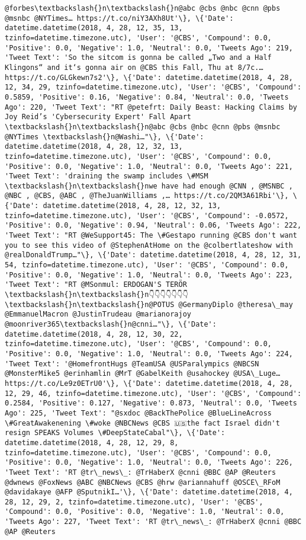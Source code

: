 \documentclass[11pt]{article}
\begin{document}
\begin{Verbatim}[commandchars=\\\{\}]
@forbes\textbackslash{}n\textbackslash{}n@abc @cbs @nbc @cnn @pbs @msnbc @NYTimes… https://t.co/niY3AXh8Ut'\}, \{'Date': datetime.datetime(2018, 4, 28, 12, 35, 13, tzinfo=datetime.timezone.utc), 'User': '@CBS', 'Compound': 0.0, 'Positive': 0.0, 'Negative': 1.0, 'Neutral': 0.0, 'Tweets Ago': 219, 'Tweet Text': 'So the sitcom is gonna be called „Two and a Half Klingons“ and it‘s gonna air on @CBS this Fall, Thu at 8/7c.… https://t.co/GLGkewn7s2'\}, \{'Date': datetime.datetime(2018, 4, 28, 12, 34, 29, tzinfo=datetime.timezone.utc), 'User': '@CBS', 'Compound': 0.5859, 'Positive': 0.16, 'Negative': 0.84, 'Neutral': 0.0, 'Tweets Ago': 220, 'Tweet Text': "RT @petefrt: Daily Beast: Hacking Claims by Joy Reid’s 'Cybersecurity Expert' Fall Apart \textbackslash{}n\textbackslash{}n@abc @cbs @nbc @cnn @pbs @msnbc @NYTimes \textbackslash{}n@Washi…"\}, \{'Date': datetime.datetime(2018, 4, 28, 12, 32, 13, tzinfo=datetime.timezone.utc), 'User': '@CBS', 'Compound': 0.0, 'Positive': 0.0, 'Negative': 1.0, 'Neutral': 0.0, 'Tweets Ago': 221, 'Tweet Text': 'draining the swamp includes \#MSM \textbackslash{}n\textbackslash{}nwe have had enough @CNN , @MSNBC , @NBC , @CBS, @ABC , @TheJuanWilliams ,… https://t.co/2QM3A61Rbi'\}, \{'Date': datetime.datetime(2018, 4, 28, 12, 32, 13, tzinfo=datetime.timezone.utc), 'User': '@CBS', 'Compound': -0.0572, 'Positive': 0.0, 'Negative': 0.94, 'Neutral': 0.06, 'Tweets Ago': 222, 'Tweet Text': "RT @WeSupport45: The \#Gestapo running @CBS don't want you to see this video of @StephenAtHome on the @colbertlateshow with @realDonaldTrump…"\}, \{'Date': datetime.datetime(2018, 4, 28, 12, 31, 54, tzinfo=datetime.timezone.utc), 'User': '@CBS', 'Compound': 0.0, 'Positive': 0.0, 'Negative': 1.0, 'Neutral': 0.0, 'Tweets Ago': 223, 'Tweet Text': "RT @MSonmul: ERDOGAN'S TERÖR \textbackslash{}n\textbackslash{}n👇👇👇👇👇👇👇\textbackslash{}n\textbackslash{}n@POTUS @GermanyDiplo @theresa\_may @EmmanuelMacron @JustinTrudeau @marianorajoy @moonriver365\textbackslash{}n@cnni…"\}, \{'Date': datetime.datetime(2018, 4, 28, 12, 30, 22, tzinfo=datetime.timezone.utc), 'User': '@CBS', 'Compound': 0.0, 'Positive': 0.0, 'Negative': 1.0, 'Neutral': 0.0, 'Tweets Ago': 224, 'Tweet Text': '@HomefrontHugs @TeamUSA @USParalympics @NBCSN @MonsterMike5 @erinhamlin @MrT @GabelKeith @usahockey @USA\_Luge… https://t.co/Le9z0ETrU0'\}, \{'Date': datetime.datetime(2018, 4, 28, 12, 29, 46, tzinfo=datetime.timezone.utc), 'User': '@CBS', 'Compound': 0.2584, 'Positive': 0.127, 'Negative': 0.873, 'Neutral': 0.0, 'Tweets Ago': 225, 'Tweet Text': "@sxdoc @BackThePolice @BlueLineAcross \#GreatAwakenening \#woke @NBCNews @CBS 🇺🇸the fact Israel didn't resign SPEAKS Volumes \#DeepStateCabal"\}, \{'Date': datetime.datetime(2018, 4, 28, 12, 29, 8, tzinfo=datetime.timezone.utc), 'User': '@CBS', 'Compound': 0.0, 'Positive': 0.0, 'Negative': 1.0, 'Neutral': 0.0, 'Tweets Ago': 226, 'Tweet Text': 'RT @tr\_news\_: @TrHaberX @cnni @BBC @AP @Reuters @dwnews @FoxNews @ABC @NBCNews @CBS @hrw @ariannahuff @OSCE\_RFoM @davidakaye @AFP @SputnikI…'\}, \{'Date': datetime.datetime(2018, 4, 28, 12, 29, 2, tzinfo=datetime.timezone.utc), 'User': '@CBS', 'Compound': 0.0, 'Positive': 0.0, 'Negative': 1.0, 'Neutral': 0.0, 'Tweets Ago': 227, 'Tweet Text': 'RT @tr\_news\_: @TrHaberX @cnni @BBC @AP @Reuters 
\end{Verbatim}
\end{document}
